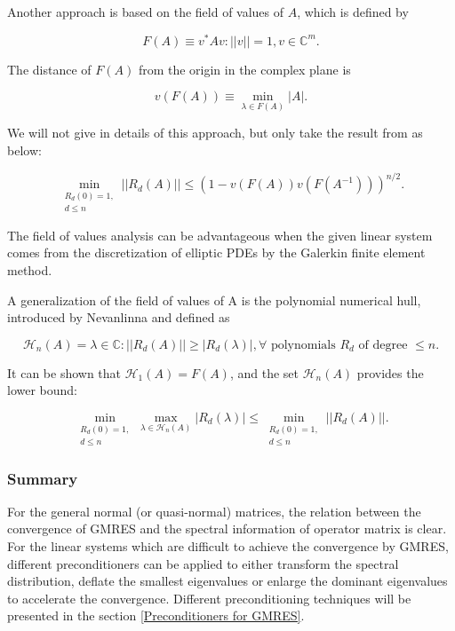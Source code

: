 {	Another approach is based on the field of values of $A$, which is defined by 
	
	\begin{equation}
	F(A)\equiv {v^*Av: ||v||=1, v \in \mathbb{C}^m}.
	\end{equation}
	
	The distance of $F(A)$ from the origin in the complex plane is
	
	\begin{equation}
	v(F(A)) \equiv \min_{\lambda \in F(A)} |A|.
	\end{equation}
	
	We will not give in details of this approach, but only take the result from \cite{starke1997field} as below:
	
	\begin{equation}
	\min_{\substack{R_d(0)=1, \\ d \leq n}} ||R_d(A)|| \leq (1-v(F(A))v(F(A^{-1})))^{n/2}.
	\end{equation}
	
	The field of values analysis can be advantageous when the given linear system comes from the discretization of elliptic PDEs by the Galerkin finite element method.
	
	A generalization of the field of values of A is the polynomial numerical hull, introduced by Nevanlinna \cite{nevanlinna2012convergence} and defined as
	
	\begin{equation}
	\mathcal{H}_n(A) = {\lambda \in \mathbb{C}: ||R_d(A)|| \geq |R_d(\lambda)|, \text{$\forall$ polynomials $R_d$ of degree $\leq n$}}.
	\end{equation}
	
	It can be shown that $\mathcal{H}_1(A) = F(A)$, and the set $\mathcal{H}_n(A)$ provides the lower bound:
	
	\begin{equation}
	\min_{\substack{R_d(0)=1, \\ d \leq n}}\max_{\lambda \in \mathcal{H}_n(A)}|R_d(\lambda)| \leq \min_{\substack{R_d(0)=1, \\ d \leq n}}||R_d(A)||.
	\end{equation}

	
	\subsubsection{Summary}
	
For the general normal (or quasi-normal) matrices, the relation between the convergence of GMRES and the spectral information of operator matrix is clear. For the linear systems which are difficult to achieve the convergence by GMRES, different preconditioners can be applied to either transform the spectral distribution, deflate the smallest eigenvalues or enlarge the dominant eigenvalues to accelerate the convergence. Different preconditioning techniques will be presented in the section \ref{Preconditioners for GMRES}.

}
